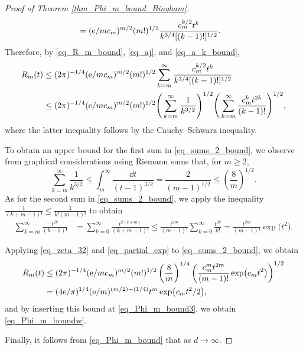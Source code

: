 \begin{proof}[Proof of Theorem \ref{thm_Phi_m_bound_Bingham}]
\begin{align}
&= ({\rm e}/m c_m)^{m/2} (m!)^{1/2} \frac{c_m^{k/2} t^k}{k^{3/4} [(k-1)!]^{1/2}}.
\end{align}
Therefore, by \eqref{eq_R_m_bound}, \eqref{eq_aj}, and \eqref{eq_a_k_bound},
\begin{align}
\label{eq_sums_2_bound}
R_m(t) &\le (2\pi)^{-1/4} ({\rm e}/m c_m)^{m/2} (m!)^{1/2} \sum_{k=m}^\infty \frac{c_m^{k/2} t^k}{k^{3/4} [(k-1)!]^{1/2}} \nonumber \\
&\le (2\pi)^{-1/4} ({\rm e}/m c_m)^{m/2} (m!)^{1/2} \Bigg(\sum_{k=m}^\infty \frac{1}{k^{3/2}}\Bigg)^{1/2} \Bigg(\sum_{k=m}^\infty \frac{c_m^k t^{2k}}{(k-1)!}\Bigg)^{1/2},
\end{align}
where the latter inequality follows by the Cauchy--Schwarz inequality.

To obtain an upper bound for the first sum in \eqref{eq_sums_2_bound}, we observe from graphical considerations using Riemann sums that, for $m \ge 2$,
\begin{equation}
\label{eq_zeta_32}
\sum_{k=m}^\infty \frac{1}{k^{3/2}} \le \int_m^\infty \frac{\dd t}{(t-1)^{3/2}} = \frac{2}{(m-1)^{1/2}} \le \left(\frac{8}{m}\right)^{1/2}.
\end{equation}
As for the second sum in \eqref{eq_sums_2_bound}, we apply the inequality
$
\frac{1}{(k+m-1)!} \le \frac{1}{k! (m-1)!}
$
to obtain
\begin{align}
\label{eq_partial_exp}
\sum_{k=m}^\infty \frac{t^{2k}}{(k-1)!} &= \sum_{k=0}^\infty \frac{t^{2(k+m)}}{(k+m-1)!} \le \frac{t^{2m}}{(m-1)!} \sum_{k=0}^\infty \frac{t^{2k}}{k!}
= \frac{t^{2m}}{(m-1)!} \exp\bigl(t^2\bigr).
\end{align}

Applying \eqref{eq_zeta_32} and \eqref{eq_partial_exp} to \eqref{eq_sums_2_bound}, we obtain
\begin{align}
R_m(t) &\le (2\pi)^{-1/4} ({\rm e}/m c_m)^{m/2} (m!)^{1/2} \left(\frac{8}{m}\right)^{1/4} \left(\frac{c_m^m t^{2m}}{(m-1)!} \exp\bigl(c_m t^2\bigr)\right)^{1/2} \nonumber \\
&= (4 {\rm e}/\pi)^{1/4} ({\rm e}/m)^{(m/2)-(1/4)} t^m \exp\bigl(c_m t^2/2\bigr),\label{eq_R_m_bound2}
\end{align}
and by inserting this bound at \eqref{eq_Phi_m_bound3}, we obtain \eqref{eq_Phi_m_boundw}.

Finally, it follows from \eqref{eq_Phi_m_bound} that  as $d \to \infty$.
\end{proof}
